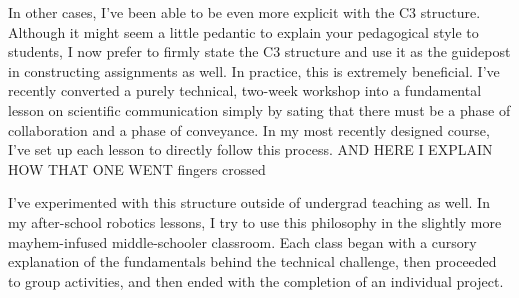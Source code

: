 \documentclass[12pt]{amsart} \usepackage{amssymb}
\begin{document}
In other cases, I've been able to be even more explicit with the C3 structure. Although it might seem a little pedantic to explain your pedagogical style to students, I now prefer to firmly state the C3 structure and use it as the guidepost in constructing assignments as well.  In practice, this is extremely beneficial.  I've recently converted a purely technical, two-week workshop into a fundamental lesson on scientific communication simply by sating that there must be a phase of collaboration and a phase of conveyance.  In my most recently designed course, I've set up each lesson to directly follow this process. AND HERE I EXPLAIN HOW THAT ONE WENT fingers crossed

I've experimented with this structure outside of undergrad teaching as well.  In my after-school robotics lessons, I try to use this philosophy in the slightly more mayhem-infused middle-schooler classroom. Each class began with a cursory explanation of the fundamentals behind the technical challenge, then proceeded to group activities, and then ended with the completion of an individual project.  
\end{document}
